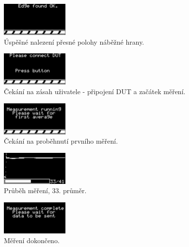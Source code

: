 \begin{figure}[H]
\includegraphics[width=0.3\textwidth,keepaspectratio,interpolate=false]{images/edge_found.png}\caption{Úspěšné nalezení přesné polohy náběžné hrany.}\label{edge_found}
\end{figure}

\begin{figure}[H]
\includegraphics[width=0.3\textwidth,keepaspectratio,interpolate=false]{images/measurement_user_wait.png}\caption{Čekání na zásah uživatele - připojení DUT a začátek měření.}\label{measurement_user_wait}
\end{figure}

\begin{figure}[H]
\includegraphics[width=0.3\textwidth,keepaspectratio,interpolate=false]{images/measurement_avg_wait.png}\caption{Čekání na proběhnutí prvního měření.}\label{measurement_avg_wait}
\end{figure}

\begin{figure}[H]
\includegraphics[width=0.3\textwidth,keepaspectratio,interpolate=false]{images/measurement_running.png}\caption{Průběh měření, 33. průměr.}\label{measurement_running}
\end{figure}

\begin{figure}[H]
\includegraphics[width=0.3\textwidth,keepaspectratio,interpolate=false]{images/measurement_complete.png}\caption{Měření dokončeno.}\label{measurement_complete}
\end{figure}